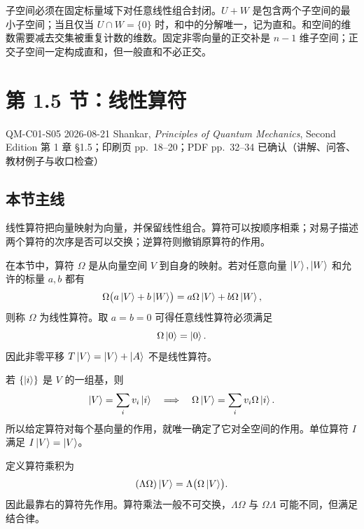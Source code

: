 子空间必须在固定标量域下对任意线性组合封闭。$U+W$ 是包含两个子空间的最小子空间；当且仅当 $U\cap W=\{0\}$ 时，和中的分解唯一，记为直和。和空间的维数需要减去交集被重复计数的维数。固定非零向量的正交补是 $n-1$ 维子空间；正交子空间一定构成直和，但一般直和不必正交。

\section{第 1.5 节：线性算符}
\label{section:QM-C01-S05}

\studymeta
  {QM-C01-S05}
  {2026-08-21}
  {Shankar, \textit{Principles of Quantum Mechanics}, Second Edition}
  {第 1 章 \S 1.5；印刷页 pp.~18--20；PDF pp.~32--34}
  {已确认（讲解、问答、教材例子与收口检查）}

\subsection{本节主线}

线性算符把向量映射为向量，并保留线性组合。算符可以按顺序相乘；对易子描述两个算符的次序是否可以交换；逆算符则撤销原算符的作用。


在本节中，算符 $\Omega$ 是从向量空间 $V$ 到自身的映射。若对任意向量 $\left|V\right\rangle,\left|W\right\rangle$ 和允许的标量 $a,b$ 都有
\begin{equation}
  \Omega\bigl(a\left|V\right\rangle+b\left|W\right\rangle\bigr)
  =a\Omega\left|V\right\rangle+b\Omega\left|W\right\rangle,
  \label{eq:QM-C01-S05-linearity}
\end{equation}
则称 $\Omega$ 为线性算符。取 $a=b=0$ 可得任意线性算符必须满足
\[
  \Omega\left|0\right\rangle=\left|0\right\rangle.
\]
因此非零平移 $T\left|V\right\rangle=\left|V\right\rangle+\left|A\right\rangle$ 不是线性算符。

若 $\{\left|i\right\rangle\}$ 是 $V$ 的一组基，则
\[
  \left|V\right\rangle=\sum_i v_i\left|i\right\rangle
  \quad\Longrightarrow\quad
  \Omega\left|V\right\rangle=\sum_i v_i\Omega\left|i\right\rangle.
\]
所以给定算符对每个基向量的作用，就唯一确定了它对全空间的作用。单位算符 $I$ 满足 $I\left|V\right\rangle=\left|V\right\rangle$。



定义算符乘积为
\begin{equation}
  (\Lambda\Omega)\left|V\right\rangle
  =\Lambda\bigl(\Omega\left|V\right\rangle\bigr).
  \label{eq:QM-C01-S05-product}
\end{equation}
因此最靠右的算符先作用。算符乘法一般不可交换，$\Lambda\Omega$ 与 $\Omega\Lambda$ 可能不同，但满足结合律。

